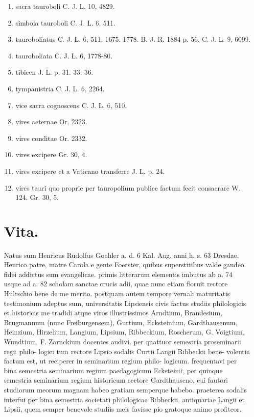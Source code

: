 \documentclass[a4paper, 11pt, oneside, polutonikogreek, german]{article}
\begin{document}
\begin{enumerate}
\item sacra tauroboli C. J. L. 10, 4829.

\item simbola tauroboli C. J. L. 6, 511.

\item tauroboliatus C. J. L. 6, 511. 1675. 1778. B. J. R. 1884 p. 56. C. J. L. 9, 6099.

\item tauroboliata C. J. L. 6, 1778-80.

\item tibicen J. L. p. 31. 33. 36.

\item tympanistria C. J. L. 6, 2264.

\item vice sacra cognoscens C. J. L. 6, 510.

\item vires aeternae Or. 2323.

\item vires conditae Or. 2332.

\item vires excipere Gr. 30, 4.

\item vires excipere et a Vaticano transferre J. L. p. 24.

\item vires tauri quo proprie per tauropolium publice factum fecit consacrare W. 124. Gr. 30, 5.
\end{enumerate}
\clearpage
\section{Vita.}
\paragraph{}
Natus sum Henricus Rudolfus Goehler a. d. 6 Kal. Aug. anni h. s. 63 Dresdae, Henrico patre, matre Carola e gente Foerster, quibus superstitibus valde gaudeo. fidei addictus sum evangelicae. primis litterarum elementis imbutus ab a. 74 usque ad a. 82 scholam sanctae crucis adii, quae nunc etiam floruit rectore Hultschio bene de me merito. postquam autem tempore vernali maturitatis testimonium adeptus sum, universitatis Lipsiensis civis factus studiis philologicis et historicis me tradidi atque viros illustrissimos Arndtium, Brandesium, Brugmannum (nunc Freiburgensem), Gurtium, Ecksteinium, Gardthausenum, Heinzium, Hirzelium, Langium, Lipsium, Ribbeckium, Roscherum, G. Voigtium, Wundtium, F. Zarnckium docentes audivi. per quattuor semestria proseminarii regii philo- logici tum rectore Lipsio sodalis Curtii Langii Ribbeckii bene- volentia factum est, ut reciperer in seminarium regium philo- logicum. frequentavi per bina semestria seminarium regium paedagogicum Ecksteinii, per quinque semestria seminarium regium historicum rectore Gardthauseno, cui fautori studiorum meorum magnam habeo gratiam semperque habebo. praeterea sodalis interfui per bina semestria societati philologicae Ribbeckii, antiquariae Langii et Lipsii, quem semper benevole studiis meis favisse pio gratoque animo profiteor.
\clearpage
\end{document}
